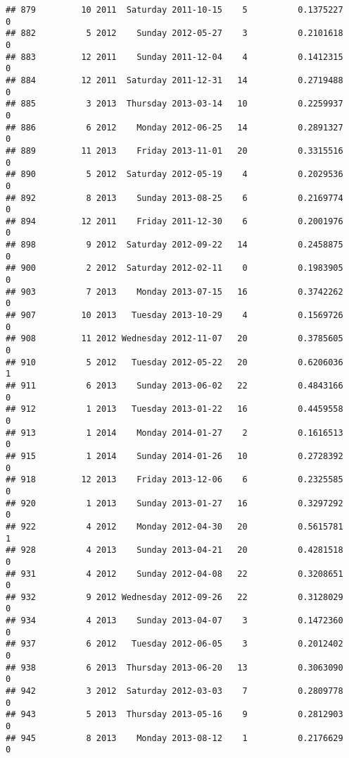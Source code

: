 \documentclass[
]{article}
\begin{document}
\begin{verbatim}
## 879         10 2011  Saturday 2011-10-15    5          0.1375227             0
## 882          5 2012    Sunday 2012-05-27    3          0.2101618             0
## 883         12 2011    Sunday 2011-12-04    4          0.1412315             0
## 884         12 2011  Saturday 2011-12-31   14          0.2719488             0
## 885          3 2013  Thursday 2013-03-14   10          0.2259937             0
## 886          6 2012    Monday 2012-06-25   14          0.2891327             0
## 889         11 2013    Friday 2013-11-01   20          0.3315516             0
## 890          5 2012  Saturday 2012-05-19    4          0.2029536             0
## 892          8 2013    Sunday 2013-08-25    6          0.2169774             0
## 894         12 2011    Friday 2011-12-30    6          0.2001976             0
## 898          9 2012  Saturday 2012-09-22   14          0.2458875             0
## 900          2 2012  Saturday 2012-02-11    0          0.1983905             0
## 903          7 2013    Monday 2013-07-15   16          0.3742262             0
## 907         10 2013   Tuesday 2013-10-29    4          0.1569726             0
## 908         11 2012 Wednesday 2012-11-07   20          0.3785605             0
## 910          5 2012   Tuesday 2012-05-22   20          0.6206036             1
## 911          6 2013    Sunday 2013-06-02   22          0.4843166             0
## 912          1 2013   Tuesday 2013-01-22   16          0.4459558             0
## 913          1 2014    Monday 2014-01-27    2          0.1616513             0
## 915          1 2014    Sunday 2014-01-26   10          0.2728392             0
## 918         12 2013    Friday 2013-12-06    6          0.2325585             0
## 920          1 2013    Sunday 2013-01-27   16          0.3297292             0
## 922          4 2012    Monday 2012-04-30   20          0.5615781             1
## 928          4 2013    Sunday 2013-04-21   20          0.4281518             0
## 931          4 2012    Sunday 2012-04-08   22          0.3208651             0
## 932          9 2012 Wednesday 2012-09-26   22          0.3128029             0
## 934          4 2013    Sunday 2013-04-07    3          0.1472360             0
## 937          6 2012   Tuesday 2012-06-05    3          0.2012402             0
## 938          6 2013  Thursday 2013-06-20   13          0.3063090             0
## 942          3 2012  Saturday 2012-03-03    7          0.2809778             0
## 943          5 2013  Thursday 2013-05-16    9          0.2812903             0
## 945          8 2013    Monday 2013-08-12    1          0.2176629             0

\end{verbatim}
\end{document}

